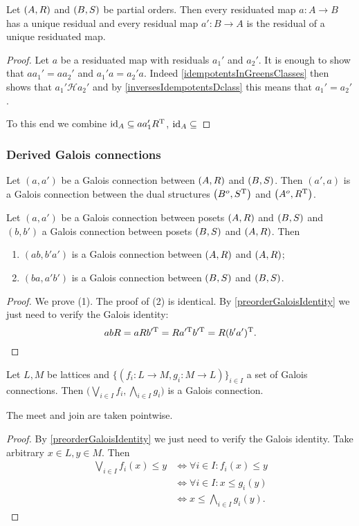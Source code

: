 \begin{proposition}
Let $\sSet{A,R}$ and $\sSet{B,S}$ be partial orders. Then every residuated map $a: A \to B$ has a unique residual and every residual map $a': B \to A$ is the residual of a unique residuated map.
\end{proposition}
\begin{proof}
Let $a$ be a residuated map with residuals $a_1'$ and $a_2'$. It is enough to show that $aa_1' = aa_2'$ and $a_1'a = a_2'a$. Indeed \ref{idempotentsInGreensClasses} then shows that $a_1'\mathcal{H}a_2'$ and by \ref{inversesIdempotentsDclass} this means that $a_1' = a_2'$.

To this end we combine $\operatorname{id}_A \subseteq aa_1'R^{\mathrm{T}}$, $\operatorname{id}_A \subseteq $
\end{proof}

\subsubsection{Derived Galois connections}
\begin{lemma}
Let $(a, a')$ be a Galois connection between $\sSet{A,R}$ and $\sSet{B,S}$. Then $(a',a)$ is a Galois connection between the dual structures $\sSet{B^o,S^\transp}$ and $\sSet{A^o,R^\transp}$.
\end{lemma}

\begin{lemma}
Let $(a, a')$ be a Galois connection between posets $\sSet{A,R}$ and $\sSet{B,S}$ and $(b, b')$ a Galois connection between posets $\sSet{B,S}$ and $\sSet{A,R}$. Then
\begin{enumerate}
\item $(ab, b'a')$ is a Galois connection between $\sSet{A,R}$ and $\sSet{A,R}$;
\item $(ba, a'b')$ is a Galois connection between $\sSet{B,S}$ and $\sSet{B,S}$.
\end{enumerate}
\end{lemma}
\begin{proof}
We prove (1). The proof of (2) is identical.
By \ref{preorderGaloisIdentity} we just need to verify the Galois identity:
\[ abR = aRb^{\prime\mathrm{T}} = Ra^{\prime\mathrm{T}}b^{\prime\mathrm{T}} = R(b'a')^{\mathrm{T}}. \]
\end{proof}

\begin{proposition} \label{joinResiduatedMaps}
Let $L,M$ be lattices and $\{(f_i:L\to M, g_i: M\to L)\}_{i\in I}$ a set of Galois connections. Then $\Big(\bigvee_{i\in I}f_i, \bigwedge_{i\in I}g_i\Big)$ is a Galois connection.
\end{proposition}
The meet and join are taken pointwise.
\begin{proof}
By \ref{preorderGaloisIdentity} we just need to verify the Galois identity. Take arbitrary $x\in L, y\in M$. Then
\begin{align*}
\bigvee_{i\in I}f_i(x) \leq y &\iff \forall i\in I: f_i(x) \leq y \\
&\iff \forall i\in I: x \leq g_i(y) \\
&\iff x \leq \bigwedge_{i\in I} g_i(y).
\end{align*}
\end{proof}

